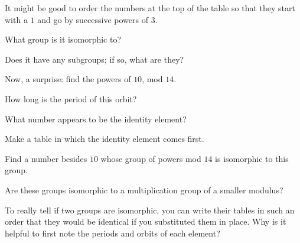 \documentclass[../gatm_answers.tex]{subfiles}
\begin{document}
\begin{inner_problem}
\item It might be good to order the numbers at the top of the table so that they start with a $1$ and go by successive powers of $3$.
\end{inner_problem}

\begin{inner_problem}
\item What group is it isomorphic to?
\end{inner_problem}

\begin{inner_problem}
\item Does it have any subgroups; if so, what are they?
\end{inner_problem}

\begin{outer_problem}
\item Now, a surprise: find the powers of $10$, mod $14$.
\end{outer_problem}

\begin{inner_problem}[start=1]
\item How long is the period of this orbit?
\end{inner_problem}

\begin{inner_problem}
\item What number appears to be the identity element?
\end{inner_problem}

\begin{inner_problem}
\item Make a table in which the identity element comes first.
\end{inner_problem}

\begin{inner_problem}
\item Find a number besides $10$ whose group of powers mod $14$ is isomorphic to this group.
\end{inner_problem}

\begin{inner_problem}
\item Are these groups isomorphic to a multiplication group of a smaller modulus?
\end{inner_problem}

\begin{outer_problem}
\item To really tell if two groups are isomorphic, you can write their tables in such an order that they would be identical if you substituted them in place. Why is it helpful to first note the periods and orbits of each element?
\end{outer_problem}
\end{document}
